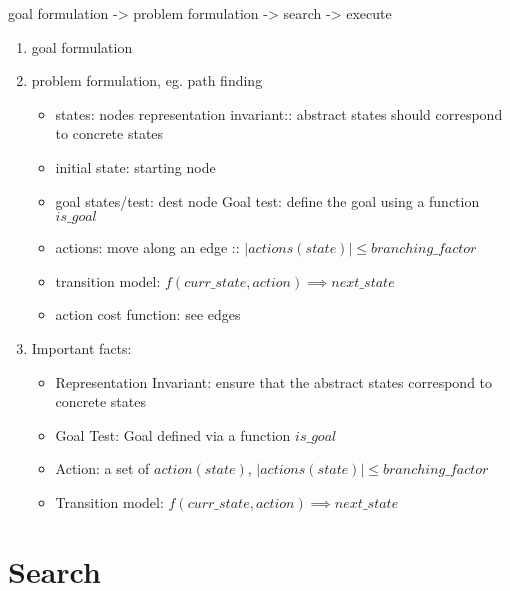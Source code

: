 \documentclass{article}
\begin{document}
goal formulation -> problem formulation -> search -> execute \newline
\begin{enumerate}
    \item goal formulation
    \item problem formulation, eg. path finding 
        \begin{itemize}
            \item states: nodes representation invariant:: abstract states should correspond to concrete states
            \item initial state: starting node
            \item goal states/test: dest node \newline
                Goal test: define the goal using a function $is\_goal $
            \item actions: move along an edge :: $|actions(state)| \leq branching\_factor$
            \item transition model: 
                $f(curr\_state, action) \implies next\_state $
            \item action cost function: see edges
        \end{itemize}
    \item Important facts:
        \begin{itemize}
            \item Representation Invariant: ensure that the abstract states correspond to concrete states
            \item Goal Test: Goal defined via a function $is\_goal$
            \item Action: a set of $action(state)$, $|actions(state)| \leq branching\_factor$
            \item Transition model: $f(curr\_state, action) \implies next\_state $
        \end{itemize}
\end{enumerate}



\section*{Search}
\end{document}
